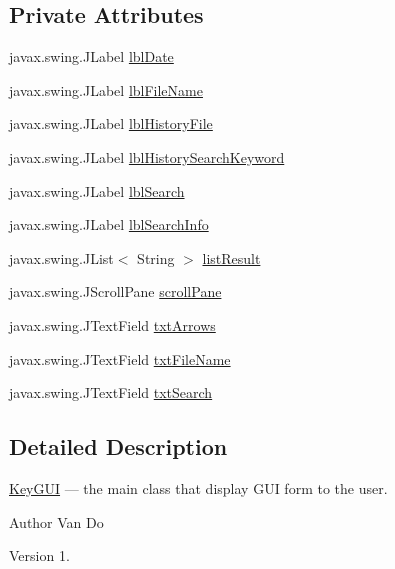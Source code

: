 \subsection*{Private Attributes}
\begin{DoxyCompactItemize}
\item 
javax.\+swing.\+J\+Label \hyperlink{classkeylistener_1_1_key_g_u_i_ad2118979cc01e139f390529e68561b36}{lbl\+Date}
\item 
javax.\+swing.\+J\+Label \hyperlink{classkeylistener_1_1_key_g_u_i_a2d31eb97ae580ba4b09f1dd84a95bdb1}{lbl\+File\+Name}
\item 
javax.\+swing.\+J\+Label \hyperlink{classkeylistener_1_1_key_g_u_i_a330b92f9f544948e4e0b55307637ce6b}{lbl\+History\+File}
\item 
javax.\+swing.\+J\+Label \hyperlink{classkeylistener_1_1_key_g_u_i_aa0cbe65091b2645ad5f3e70be1d33702}{lbl\+History\+Search\+Keyword}
\item 
javax.\+swing.\+J\+Label \hyperlink{classkeylistener_1_1_key_g_u_i_a651562b55ac5b267be118fa85ee83b5d}{lbl\+Search}
\item 
javax.\+swing.\+J\+Label \hyperlink{classkeylistener_1_1_key_g_u_i_aa1b6d17eb8dab8ab033595be8cc66b81}{lbl\+Search\+Info}
\item 
javax.\+swing.\+J\+List$<$ String $>$ \hyperlink{classkeylistener_1_1_key_g_u_i_a53c4619456ef147805fdbd0f33527fa7}{list\+Result}
\item 
javax.\+swing.\+J\+Scroll\+Pane \hyperlink{classkeylistener_1_1_key_g_u_i_a036bb4e1e1c9b3761717272205313fe1}{scroll\+Pane}
\item 
javax.\+swing.\+J\+Text\+Field \hyperlink{classkeylistener_1_1_key_g_u_i_aa44762235ff4e3550950dded18266104}{txt\+Arrows}
\item 
javax.\+swing.\+J\+Text\+Field \hyperlink{classkeylistener_1_1_key_g_u_i_a49dc969b4b81645b57ce0ac461617031}{txt\+File\+Name}
\item 
javax.\+swing.\+J\+Text\+Field \hyperlink{classkeylistener_1_1_key_g_u_i_a12219fa977d21d4d00c2bdd827103a41}{txt\+Search}
\end{DoxyCompactItemize}


\subsection{Detailed Description}
\hyperlink{classkeylistener_1_1_key_g_u_i}{Key\+G\+UI} --- the main class that display G\+UI form to the user. \begin{DoxyAuthor}{Author}
Van Do 
\end{DoxyAuthor}
\begin{DoxyVersion}{Version}
1. 
\end{DoxyVersion}


